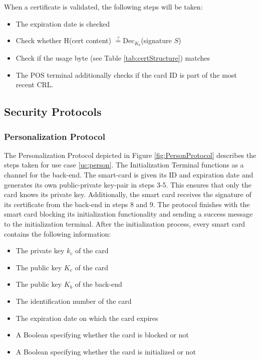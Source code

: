 When a certificate is validated, the following steps will be taken:
\begin{itemize}
    \item The expiration date is checked
    \item Check whether H(cert content) $\stackrel{?}{=} \textrm{Dec}_{K_b}$(signature $S$)
    \item Check if the usage byte (see Table \ref{tab:certStructure}) matches
    \item The POS terminal additionally checks if the card ID is part of the most recent CRL.
\end{itemize}


\subsection{Security Protocols}

\subsubsection{Personalization Protocol} \label{sec:perProtocol}
The Personalization Protocol depicted in Figure \ref{fig:PersonProtocol} describes the steps taken for use case \ref{uc:person}.
The Initialization Terminal functions as a channel for the back-end. 
The smart-card is given its ID and expiration date and generates its own public-private key-pair in steps 3-5. 
This ensures that only the card knows its private key. 
Additionally, the smart card receives the signature of its certificate from the back-end in steps 8 and 9.
The protocol finishes with the smart card blocking its initialization functionality and sending a success message to the initialization terminal. 
After the initialization process, every smart card contains the following information:
\begin{itemize}
    \item The private key $k_c$ of the card
    \item The public key $K_c$ of the card
    \item The public key $K_b$ of the back-end
    \item The identification number of the card
    \item The expiration date on which the card expires
    \item A Boolean specifying whether the card is blocked or not
    \item A Boolean specifying whether the card is initialized or not
\end{itemize}

